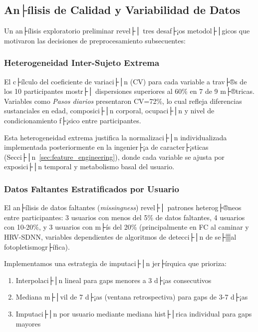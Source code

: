 \subsection{An├ílisis de Calidad y Variabilidad de Datos}
\label{subsec:analisis_calidad_datos}

Un an├ílisis exploratorio preliminar revel├│ tres desaf├¡os metodol├│gicos que motivaron las decisiones de preprocesamiento subsecuentes:

\subsubsection{Heterogeneidad Inter-Sujeto Extrema}

El c├ílculo del coeficiente de variaci├│n (CV) para cada variable a trav├®s de los 10 participantes mostr├│ dispersiones superiores al 60\% en 7 de 9 m├®tricas. Variables como \textit{Pasos diarios} presentaron CV=72\%, lo cual refleja diferencias sustanciales en edad, composici├│n corporal, ocupaci├│n y nivel de condicionamiento f├¡sico entre participantes.

Esta heterogeneidad extrema justifica la normalizaci├│n individualizada implementada posteriormente en la ingenier├¡a de caracter├¡sticas (Secci├│n~\ref{sec:feature_engineering}), donde cada variable se ajusta por exposici├│n temporal y metabolismo basal del usuario.

\subsubsection{Datos Faltantes Estratificados por Usuario}

El an├ílisis de datos faltantes (\textit{missingness}) revel├│ patrones heterog├®neos entre participantes: 3 usuarios con menos del 5\% de datos faltantes, 4 usuarios con 10-20\%, y 3 usuarios con m├ís del 20\% (principalmente en FC al caminar y HRV-SDNN, variables dependientes de algoritmos de detecci├│n de se├▒al fotopletismogr├ífica).

Implementamos una estrategia de imputaci├│n jer├írquica que prioriza:
\begin{enumerate}
    \item Interpolaci├│n lineal para gaps menores a 3 d├¡as consecutivos
    \item Mediana m├│vil de 7 d├¡as (ventana retrospectiva) para gaps de 3-7 d├¡as
    \item Imputaci├│n por usuario mediante mediana hist├│rica individual para gaps mayores
\end{enumerate}

